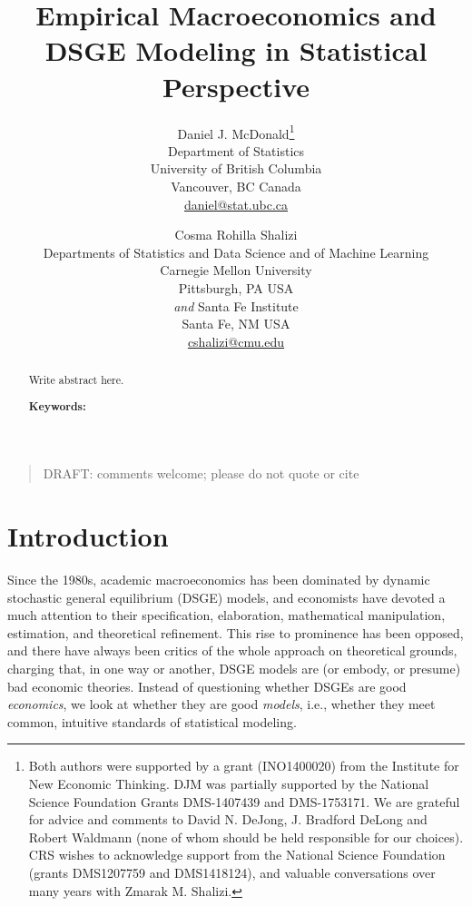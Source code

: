 \documentclass[11pt]{article}
\newcommand{\email}[1]{\href{mailto:#1}{#1}}
\begin{document}

\title{Empirical Macroeconomics and DSGE Modeling in Statistical
Perspective}
\author{  
    Daniel J. McDonald\thanks{Both authors were supported by a grant
(INO1400020) from the Institute for New Economic Thinking. DJM was
partially supported by the National Science Foundation Grants
DMS-1407439 and DMS-1753171. We are grateful for advice and comments to
David N. DeJong, J. Bradford DeLong and Robert Waldmann (none of whom
should be held responsible for our choices). CRS wishes to acknowledge
support from the National Science Foundation (grants DMS1207759 and
DMS1418124), and valuable conversations over many years with Zmarak M.
Shalizi.}  \\
  Department of Statistics\\
University of British Columbia\\
Vancouver, BC Canada\\
\email{daniel@stat.ubc.ca}  
   \and   Cosma Rohilla Shalizi \\
  Departments of Statistics and Data Science and of Machine Learning\\
Carnegie Mellon University\\
Pittsburgh, PA USA\\
\emph{and} Santa Fe Institute\\
Santa Fe, NM USA\\
\email{cshalizi@cmu.edu}  
  }
\date{}

\maketitle

\begin{quotation}
DRAFT: comments welcome; please do not quote or cite
\end{quotation}

\begin{abstract}
  Write abstract here. 
  
  \vspace{11pt}
  \noindent\textbf{Keywords:} 
\end{abstract}


\hypertarget{introduction}{%
\section{Introduction}\label{introduction}}

Since the 1980s, academic macroeconomics has been dominated by dynamic
stochastic general equilibrium (DSGE) models, and economists have
devoted a much attention to their specification, elaboration,
mathematical manipulation, estimation, and theoretical refinement. This
rise to prominence has been opposed, and there have always been critics
of the whole approach on theoretical grounds, charging that, in one way
or another, DSGE models are (or embody, or presume) bad economic
theories. Instead of questioning whether DSGEs are good
\emph{economics}, we look at whether they are good \emph{models}, i.e.,
whether they meet common, intuitive standards of statistical modeling.
\end{document}
